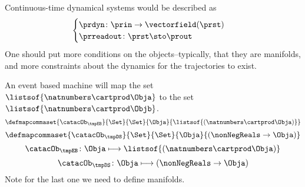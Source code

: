 Continuous-time dynamical systems would be described as
%
\begin{equation}
    \label{eq:continuous}
    \begin{cases}
        \prdyn\colon \prin \to \vectorfield(\prst) \\
        \prreadout\colon \prst \sto \prout
    \end{cases}
\end{equation}
%
One should put more conditions on the objects--typically, that they are manifolds, and more constraints about the dynamics for the trajectories to exist.

An event based machine will map the set~$\listsof{\natnumbers \cartprod \Obja}$ to the set~$\listsof{\natnumbers \cartprod \Objb}$.
%
\begin{equation}
    \defmapcommaset{
        \catacOb_{\tmpEB}
    }{
        \Set
    }{
        \Set
    }{
        \Obja
    }{
        \listsof{(\natnumbers \cartprod \Obja)}
    }
\end{equation}
%
\begin{equation}
    \defmapcommaset{
        \catacOb_{\tmpDS}
    }{
        \Set
    }{
        \Set
    }{
        \Obja
    }{
        (\nonNegReals \to \Obja)
    }
\end{equation}
%
\begin{equation}
    \label{eq:phi-EB}
    {\catacOb_{\tmpEB}}\colon{\Obja}\longmapsto{\listsof{(\natnumbers \cartprod \Obja)}}
\end{equation}
%
\begin{equation}
    \label{eq:phi-DS}
    {\catacOb_{\tmpDS}}\colon{\Obja}\longmapsto{(\nonNegReals \to \Obja)}
\end{equation}
%
Note for the last one we need to define manifolds.
